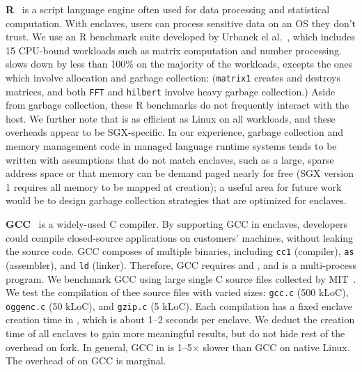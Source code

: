 {\bf R}~\cite{r-project} is a script language engine often used for
data processing and statistical computation.
With enclaves, users can process sensitive data on an
OS they don't trust.
We use an R benchmark suite developed by Urbanek el al.~\cite{r-benchmark-25}, which includes 15 CPU-bound workloads such as matrix computation and number processing.
\graphenesgx{} slows down by less than 100\% on the majority of the workloads, excepts the ones which involve allocation and garbage collection: ({\tt matrix1} creates and destroys matrices, and both {\tt FFT} and {\tt hilbert} involve heavy garbage collection.)
Aside from garbage collection, these R benchmarks do not frequently interact with the host.
We further note that  \graphene{} is as efficient as Linux on all workloads, 
and these overheads appear to be SGX-specific.
In our experience, garbage collection and memory management code in managed language runtime
systems tends to be written with assumptions that do not match enclaves,
such as a large, sparse address space or that memory can be demand paged 
nearly for free (SGX version 1 requires all memory to be mapped
at creation); a useful area for future work would be to design
garbage collection strategies that are optimized for enclaves.
 
{\bf GCC}~\cite{gcc} is a widely-used C compiler.
By supporting GCC in enclaves, developers could compile closed-source applications on customers' machines,
without leaking the source code.
GCC composes of multiple binaries, including {\tt cc1} (compiler), {\tt as} (assembler), and {\tt ld} (linker).
Therefore, GCC requires  and , and is a multi-process program.
We benchmark GCC using large single C source files collected by MIT~\cite{gcc-benchmark}.
We test the compilation of thee source files with varied sizes: {\tt gcc.c} (500 kLoC), {\tt oggenc.c} (50 kLoC), and {\tt gzip.c} (5 kLoC).
Each compilation has a fixed enclave creation time in \graphenesgx{}, which is about 1--2 seconds per enclave. We deduct the creation time of all enclaves  to gain more meaningful results, but do not hide rest of the overhead on fork.
In general, GCC in \graphenesgx{} is 1--5$\times$ slower than GCC on native Linux. 
The overhead of \graphene{} on GCC is marginal.
 



